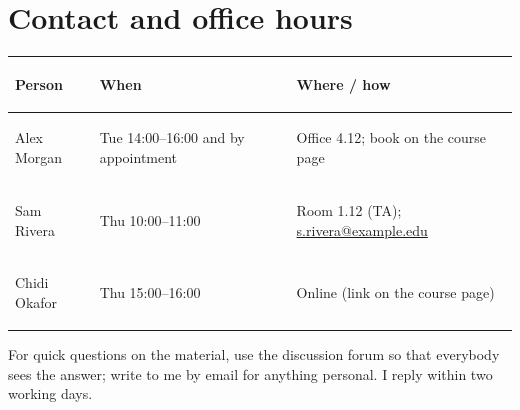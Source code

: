 \documentclass[11pt,a4paper]{article}
\begin{document}
\section{Contact and office hours}
\begin{tabularx}{\textwidth}{@{}>{\bfseries\raggedright\arraybackslash}p{3.9cm}>{\raggedright\arraybackslash}p{5.2cm}L@{}}
  \toprule
  Person & \textbf{When} & \textbf{Where / how} \\
  \midrule
  Alex Morgan  & Tue 14:00--16:00 and by appointment & Office 4.12; book on the course page \\
  Sam Rivera   & Thu 10:00--11:00 & Room 1.12 (TA); \href{mailto:s.rivera@example.edu}{s.rivera@example.edu} \\
  Chidi Okafor & Thu 15:00--16:00 & Online (link on the course page) \\
  \bottomrule
\end{tabularx}

\smallskip
For quick questions on the material, use the discussion forum so that everybody sees the
answer; write to me by email for anything personal. I reply within two working days.
\end{document}
